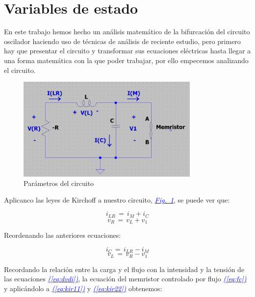 \documentclass[12pt,a4paper]{report} %
\newcommand{\fref}[1]{\hyperref[#1]{\textcolor{blue}{\textit{Fig.~\ref*{#1}}}}}
\newcommand{\eref}[1]{\hyperref[#1]{\textcolor{blue}{\textit{(\ref*{#1})}}}}
\begin{document}
	\newpage
	
	\section{Variables de estado}
	En este trabajo hemos hecho un análisis matemático de la bifurcación del circuito oscilador haciendo uso de técnicas de análisis de reciente estudio, pero primero hay que presentar el circuito y transformar sus ecuaciones eléctricas hasta llegar a una forma matemática con la que poder trabajar, por ello empecemos analizando el circuito.
	
	\begin{figure}[h]
		\centering
		\includegraphics[width=0.8\textwidth]{circuito.png}
		\caption{Parámetros del circuito}
		\label{fig:circuito}
	\end{figure}\smallskip
	
	Aplicanco las leyes de Kirchoff a nuestro circuito, \fref{fig:circuito}, se puede ver que:
	
	\begin{equation}
		i_{LR}\,=\,i_M+i_C
		\label{eq:kir1}
	\end{equation}
	\begin{equation}
		v_R\,=\,v_L+v_1
		\label{eq:kir2}
	\end{equation}
	
	Reordenando las anteriores ecuaciones:
	
	\begin{equation}
		i_C\,=\,i_{LR}-i_M
		\label{eq:kir11}
	\end{equation}
	\begin{equation}
		v_L\,=\,v_R-v_1
		\label{eq:kir22}
	\end{equation}
	
	Recordando la relación entre la carga y el flujo con la intensidad y la tensión de las ecuaciones \eref{eq:dvdi}, la ecuación del memristor controlado por flujo \eref{eq:fc} y aplicándolo a \eref{eq:kir11} y \eref{eq:kir22} obtenemos:
	
\end{document}
